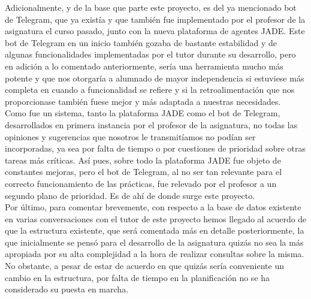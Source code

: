 Adicionalmente, y de la base que parte este proyecto, es del ya mencionado bot de Telegram, que ya existía y que también fue implementado por el profesor de la asignatura el curso pasado, junto con la nueva plataforma de agentes JADE. Este bot de Telegram en un inicio también gozaba de bastante estabilidad y de algunas funcionalidades implementadas por el tutor durante su desarrollo, pero en adición a lo comentado anteriormente, sería una herramienta mucho más potente y que nos otorgaría a alumnado de mayor independencia si estuviese más completa en cuando a funcionalidad se refiere y si la retroalimentación que nos proporcionase también fuese mejor y más adaptada a nuestras necesidades.\\

Como fue un sistema, tanto la plataforma JADE como el bot de Telegram, desarrollados en primera instancia por el profesor de la asignatura, no todas las opiniones y sugerencias que nosotros le transmitíamos no podían ser incorporadas, ya sea por falta de tiempo o por cuestiones de prioridad sobre otras tareas más críticas. Así pues, sobre todo la plataforma JADE fue objeto de constantes mejoras, pero el bot de Telegram, al no ser tan relevante para el correcto funcionamiento de las prácticas, fue relevado por el profesor a un segundo plano de prioridad. Es de ahí de donde surge este proyecto.\\

Por último, para comentar brevemente, con respecto a la base de datos existente en varias conversaciones con el tutor de este proyecto hemos llegado al acuerdo de que la estructura existente, que será comentada más en detalle posteriormente, la que inicialmente se pensó para el desarrollo de la asignatura quizás no sea la más apropiada por su alta complejidad a la hora de realizar consultas sobre la misma. No obstante, a pesar de estar de acuerdo en que quizás sería conveniente un cambio en la estructura, por falta de tiempo en la planificación no se ha considerado su puesta en marcha.